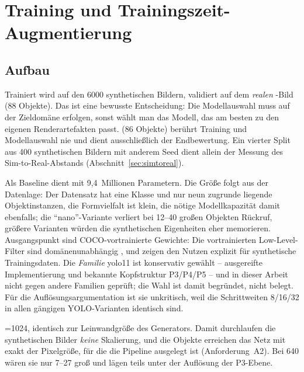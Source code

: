 \chapter{Training und Trainingszeit-Augmentierung}
\label{kap:trainingszeit}

\section{Aufbau}
\label{sec:trainingsaufbau}

 Trainiert wird auf den 6000 synthetischen Bildern,
validiert auf dem \emph{realen} -Bild (88 Objekte). Das ist eine
bewusste Entscheidung: Die Modellauswahl muss auf der Zieldomäne erfolgen, sonst
wählt man das Modell, das am besten zu den eigenen Renderartefakten passt.
 (86 Objekte) berührt Training und Modellauswahl nie und dient
ausschließlich der Endbewertung. Ein vierter Split  aus 400
synthetischen Bildern mit anderem Seed dient allein der Messung des
Sim-to-Real-Abstands (Abschnitt~\ref{sec:simtoreal}).

 Als Baseline dient  mit 9,4~Millionen
Parametern. Die Größe folgt aus der Datenlage: Der Datensatz hat eine Klasse und
nur neun zugrunde liegende Objektinstanzen, die Formvielfalt ist klein, die
nötige Modellkapazität damit ebenfalls; die \enquote{nano}-Variante verliert bei
12--40\px{} großen Objekten Rückruf, größere Varianten würden die synthetischen
Eigenheiten eher memorieren. Ausgangspunkt sind COCO-vortrainierte Gewichte: Die
vortrainierten Low-Level-Filter sind domänenunabhängig \parencite{yosinski2014},
und \textcite{hinterstoisser2018} zeigen den Nutzen explizit für synthetische
Trainingsdaten. Die \emph{Familie} yolo11 ist konservativ gewählt --
ausgereifte Implementierung und bekannte Kopfstruktur P3/P4/P5 -- und in dieser
Arbeit nicht gegen andere Familien geprüft; die Wahl ist damit begründet, nicht
belegt. Für die Auflösungsargumentation ist sie unkritisch, weil die
Schrittweiten 8/16/32 in allen gängigen YOLO-Varianten identisch sind.

 =1024, identisch zur Leinwandgröße des
Generators. Damit durchlaufen die synthetischen Bilder \emph{keine} Skalierung,
und die Objekte erreichen das Netz mit exakt der Pixelgröße, für die die Pipeline
ausgelegt ist (Anforderung~A2). Bei 640\px{} wären sie nur 7--27\px{} groß und
lägen teils unter der Auflösung der P3-Ebene.

